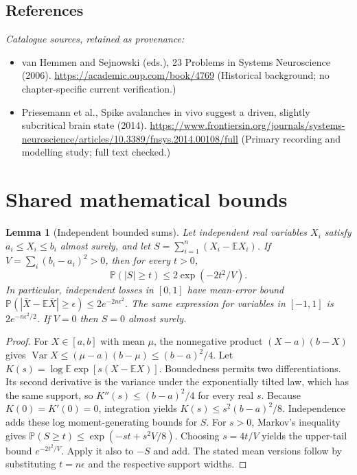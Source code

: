 \documentclass[11pt]{article}
\newcommand{\E}{\mathbb E}
\newcommand{\Prob}{\mathbb P}
\DeclareMathOperator{\Var}{Var}
\providecommand{\E}{\mathbb E}
\providecommand{\Prob}{\mathbb P}
\providecommand{\Var}{\operatorname{Var}}
\newtheorem{sharedlemma}{Lemma}[section]
\begin{document}
\subsection{References}
\noindent\emph{Catalogue sources, retained as provenance:}
\begin{itemize}
\item van Hemmen and Sejnowski (eds.), 23 Problems in Systems Neuroscience (2006). \url{https://academic.oup.com/book/4769} (Historical background; no chapter-specific current verification.)
\item Priesemann et al., Spike avalanches in vivo suggest a driven, slightly subcritical brain state (2014). \url{https://www.frontiersin.org/journals/systems-neuroscience/articles/10.3389/fnsys.2014.00108/full} (Primary recording and modelling study; full text checked.)
\end{itemize}
\clearpage


\appendix
\section{Shared mathematical bounds}\label{app:bounds}
\begin{sharedlemma}[Independent bounded sums]\label{lem:bounded}
Let independent real variables $X_i$ satisfy $a_i\leq X_i\leq b_i$ almost surely,
and let $S=\sum_{i=1}^n(X_i-\E X_i)$. If
$V=\sum_i(b_i-a_i)^2>0$, then for every $t>0$,
\[
 \Prob(|S|\geq t)\leq 2\exp(-2t^2/V).
\]
In particular, independent losses in $[0,1]$ have mean-error bound
$\Prob(|\overline X-\E\overline X|\geq\epsilon)
\leq2e^{-2n\epsilon^2}$. The same expression for variables in $[-1,1]$
is $2e^{-n\epsilon^2/2}$. If $V=0$ then $S=0$ almost surely.
\end{sharedlemma}
\begin{proof}
For $X\in[a,b]$ with mean $\mu$, the nonnegative product
$(X-a)(b-X)$ gives
$\Var X\leq(\mu-a)(b-\mu)\leq(b-a)^2/4$.
Let $K(s)=\log\E\exp[s(X-\E X)]$.
Boundedness permits two differentiations. Its second derivative is the variance
under the exponentially tilted law, which has the same support, so
$K''(s)\leq(b-a)^2/4$ for every real $s$.
Because $K(0)=K'(0)=0$, integration yields
$K(s)\leq s^2(b-a)^2/8$.
Independence adds these log moment-generating bounds for $S$.
For $s>0$, Markov's inequality gives
$\Prob(S\geq t)\leq\exp(-st+s^2V/8)$.
Choosing $s=4t/V$ yields the upper-tail bound $e^{-2t^2/V}$.
Apply it also to $-S$ and add. The stated mean versions follow by substituting
$t=n\epsilon$ and the respective support widths.
\end{proof}
\end{document}
